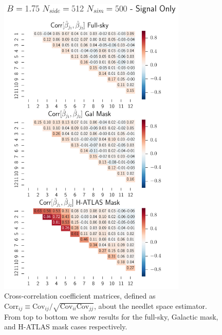 \begin{figure}[tbp]
\centering %
\includegraphics[width=0.8\textwidth]{Chapter5/Images/corr_val_needlet_nside512_nsim500_jmax12.pdf}
\caption{\label{fig:needsims_corr} Cross-correlation coefficient matrices, defined as $\text{Corr}_{ij} \equiv \text{Cov}_{ij}/\sqrt{\text{Cov}_{ii}\text{Cov}_{jj}}$, about the needlet space 
estimator. From top to bottom we show results for the full-sky, Galactic mask, and H-ATLAS mask
cases respectively. }
\end{figure}
%


